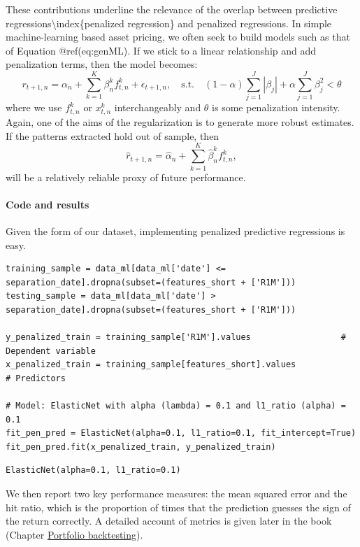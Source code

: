 These contributions underline the relevance of the overlap between predictive regressions{\textbackslash}index\{penalized regression\} and penalized regressions. In simple machine-learning based asset pricing, we often seek to build models such as that of Equation @ref(eq:genML). If we stick to a linear relationship and add penalization terms, then the model becomes:
\begin{equation}
r_{t+1,n} = \alpha_n + \sum_{k=1}^K\beta_n^kf^k_{t,n}+\epsilon_{t+1,n}, \quad \text{s.t.} \quad (1-\alpha)\sum_{j=1}^J |\beta_j| +\alpha\sum_{j=1}^J \beta_j^2< \theta
\end{equation}
where we use $f^k_{t,n}$ or $x_{t,n}^k$ interchangeably and $\theta$ is some penalization intensity. Again, one of the aims of the regularization is to generate more robust estimates. If the patterns extracted hold out of sample, then
\begin{equation}
\hat{r}_{t+1,n} = \hat{\alpha}_n + \sum_{k=1}^K\hat{\beta}_n^kf^k_{t,n},
\end{equation}
will be a relatively reliable proxy of future performance.

\paragraph{Code and results}

Given the form of our dataset, implementing penalized predictive regressions is easy.

\begin{verbatim}
training_sample = data_ml[data_ml['date'] <= separation_date].dropna(subset=(features_short + ['R1M']))
testing_sample = data_ml[data_ml['date'] > separation_date].dropna(subset=(features_short + ['R1M']))

y_penalized_train = training_sample['R1M'].values                  # Dependent variable
x_penalized_train = training_sample[features_short].values                   # Predictors

# Model: ElasticNet with alpha (lambda) = 0.1 and l1_ratio (alpha) = 0.1
fit_pen_pred = ElasticNet(alpha=0.1, l1_ratio=0.1, fit_intercept=True)
fit_pen_pred.fit(x_penalized_train, y_penalized_train)
\end{verbatim}

\begin{verbatim}
ElasticNet(alpha=0.1, l1_ratio=0.1)
\end{verbatim}

We then report two key performance measures: the mean squared error and the hit ratio, which is the proportion of times that the prediction guesses the sign of the return correctly. A detailed account of metrics is given later in the book (Chapter \href{/chap-15-portfolio-backtesting}{Portfolio backtesting}).

